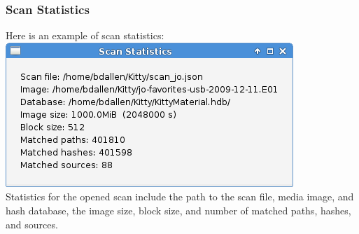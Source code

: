 \documentclass[11pt,fleqn]{article} %
\begin{document}
\subsubsection{Scan Statistics}
Here is an example of scan statistics:\\
\includegraphics[scale=.4]{screenshots/scan_statistics}\\
Statistics for the opened scan include the path to the scan file, media image, and hash database, the image size, block size, and number of matched paths, hashes, and sources.
\end{document}
